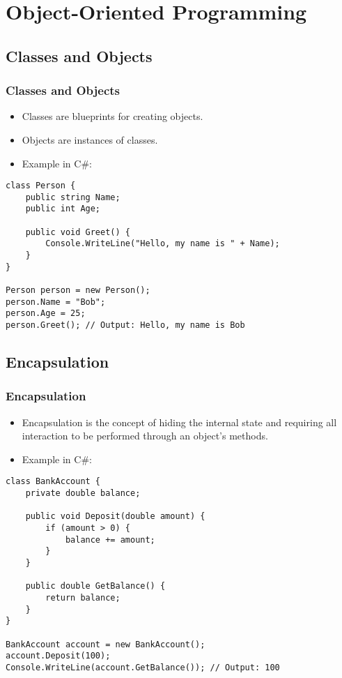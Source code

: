 \section{Object-Oriented Programming}

\subsection{Classes and Objects}
\begin{frame}[fragile]
\frametitle{Classes and Objects}
\begin{itemize}
    \item Classes are blueprints for creating objects.
    \item Objects are instances of classes.
    \item Example in C\#:
\end{itemize}
\begin{verbatim}
class Person {
    public string Name;
    public int Age;

    public void Greet() {
        Console.WriteLine("Hello, my name is " + Name);
    }
}

Person person = new Person();
person.Name = "Bob";
person.Age = 25;
person.Greet(); // Output: Hello, my name is Bob
\end{verbatim}
\end{frame}

\subsection{Encapsulation}
\begin{frame}[fragile]
\frametitle{Encapsulation}
\begin{itemize}
    \item Encapsulation is the concept of hiding the internal state and requiring all interaction to be performed through an object's methods.
    \item Example in C\#:
\end{itemize}
\begin{verbatim}
class BankAccount {
    private double balance;

    public void Deposit(double amount) {
        if (amount > 0) {
            balance += amount;
        }
    }

    public double GetBalance() {
        return balance;
    }
}

BankAccount account = new BankAccount();
account.Deposit(100);
Console.WriteLine(account.GetBalance()); // Output: 100
\end{verbatim}
\end{frame}
